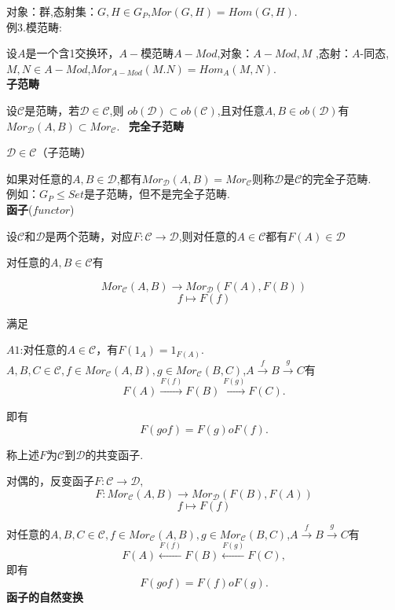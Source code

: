 \documentclass[UTF8]{article}
\begin{document}
对象：群,态射集：$G,H\in G_{P}$,$Mor(G,H)=Hom(G,H).$\\
例3.模范畴:


设$A$是一个含1交换环，$A-$模范畴$A-Mod$,对象：$A-Mod,M$
,态射：$A$-同态,$M,N\in A-Mod$,$Mor_{A-Mod}(M.N)=Hom_{A}(M,N).$\\
\textbf{子范畴}


设$\mathscr{C}$是范畴，若$\mathscr{D}\in \mathscr{C}$,则
$ob(\mathscr{D})\subset ob(\mathscr{C})$,且对任意$A,B\in ob(\mathscr{D})$有$Mor_{\mathscr{D}}(A,B)\subset Mor_{\mathscr{C}}.$ 
\
\textbf{完全子范畴}

$\mathscr{D}\in \mathscr{C}$（子范畴）

如果对任意的$A,B\in \mathscr{D}$,都有$Mor_{\mathscr{D}}(A,B)=Mor_{\mathscr{C}}$则称$\mathscr{D}$是$\mathscr{C}$的完全子范畴.
\\
例如：$G_{P}\leqslant Set$是子范畴，但不是完全子范畴.\\
\textbf{函子}($functor$)

设$\mathscr{C}$和$\mathscr{D}$是两个范畴，对应$F:\mathscr{C}\longrightarrow \mathscr{D}$,则对任意的$A\in \mathscr{C}$都有$F(A)\in \mathscr{D}$

对任意的$A,B\in \mathscr{C}$有

$$Mor_{\mathscr{C}}(A,B)\longrightarrow Mor_{\mathscr{D}}(F(A),F(B))$$
$$f\longmapsto F(f)$$

满足

$A1$:对任意的$A\in \mathscr{C}$，有$F(1_{A})=1_{F(A)}$.\\
$A,B,C\in \mathscr{C},f\in Mor_{\mathscr{C}}(A,B),g\in Mor_{\mathscr{C}}(B,C)$,$A\xrightarrow{f}B\xrightarrow{g}C$有
$$F(A)\xrightarrow{F(f)}F(B)\xrightarrow{F(g)}F(C).$$

即有
$$F(gof)=F(g)oF(f).$$

称上述$F$为$\mathscr{C}$到$\mathscr{D}$的共变函子.

对偶的，反变函子$F:\mathscr{C}\longrightarrow \mathscr{D},$
$$F:Mor_{\mathscr{C}}(A,B)\longrightarrow Mor_{\mathscr{D}}(F(B),F(A))$$
$$f\longmapsto F(f)$$

对任意的$A,B,C\in \mathscr{C},f\in Mor_{\mathscr{C}}(A,B),g\in Mor_{\mathscr{C}}(B,C)$,$A\xrightarrow{f}B\xrightarrow{g}C$有
$$F(A)\xleftarrow{F(f)}F(B)\xleftarrow{F(g)}F(C),$$
即有
$$F(gof)=F(f)oF(g).$$
\textbf{函子的自然变换}
\end{document}
